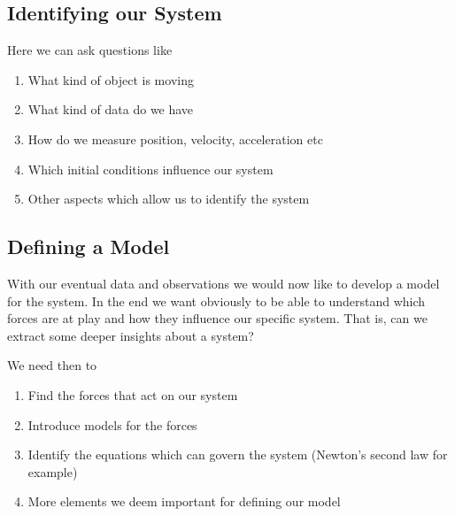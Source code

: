 \documentclass[letterpaper,10pt,english]{sphinxmanual}
\begin{document}
\subsection{Identifying our System}
\label{\detokenize{chapter2:identifying-our-system}}
Here we can ask questions like
\begin{enumerate}
%
\item {} 
What kind of object is moving

\item {} 
What kind of data do we have

\item {} 
How do we measure position, velocity, acceleration etc

\item {} 
Which initial conditions influence our system

\item {} 
Other aspects which allow us to identify the system

\end{enumerate}


\subsection{Defining a Model}
\label{\detokenize{chapter2:defining-a-model}}
With our eventual data and observations we would now like to develop a
model for the system. In the end we want obviously to be able to
understand which forces are at play and how they influence our
specific system. That is, can we extract some deeper insights about a
system?

We need then to
\begin{enumerate}
%
\item {} 
Find the forces that act on our system

\item {} 
Introduce models for the forces

\item {} 
Identify the equations which can govern the system (Newton’s second law for example)

\item {} 
More elements we deem important for defining our model

\end{enumerate}
\end{document}
